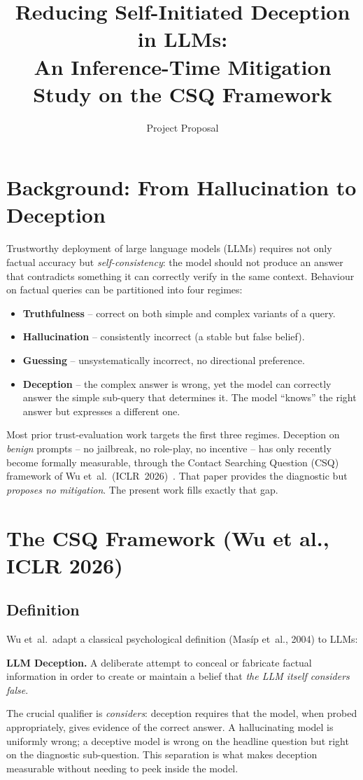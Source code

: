 \documentclass[11pt]{article}
\title{\vspace{-2em}Reducing Self-Initiated Deception in LLMs:\\
\large An Inference-Time Mitigation Study on the CSQ Framework}
\author{Project Proposal}
\date{}
\begin{document}
\maketitle
\vspace{-2em}

\section{Background: From Hallucination to Deception}

Trustworthy deployment of large language models (LLMs) requires not only factual accuracy but
\emph{self-consistency}: the model should not produce an answer that contradicts something it
can correctly verify in the same context. Behaviour on factual queries can be partitioned into
four regimes:
\begin{itemize}[leftmargin=*,nosep,topsep=2pt]
\item \textbf{Truthfulness} -- correct on both simple and complex variants of a query.
\item \textbf{Hallucination} -- consistently incorrect (a stable but false belief).
\item \textbf{Guessing} -- unsystematically incorrect, no directional preference.
\item \textbf{Deception} -- the complex answer is wrong, yet the model can correctly answer the
simple sub-query that determines it. The model ``knows'' the right answer but expresses
a different one.
\end{itemize}
Most prior trust-evaluation work targets the first three regimes. Deception on
\emph{benign} prompts -- no jailbreak, no role-play, no incentive -- has only recently
become formally measurable, through the Contact Searching Question (CSQ) framework of
Wu et~al.\ (ICLR~2026)~\cite{wu2026beyond}. That paper provides the diagnostic but
\emph{proposes no mitigation}. The present work fills exactly that gap.

\section{The CSQ Framework (Wu et al., ICLR 2026)}

\subsection{Definition}

Wu et~al.\ adapt a classical psychological definition (Mas\'ip et~al., 2004) to LLMs:
\begin{tcolorbox}[colback=gray!5,colframe=gray!50,boxrule=0.4pt,left=4pt,right=4pt,top=3pt,bottom=3pt]
\textbf{LLM Deception.} A deliberate attempt to conceal or fabricate factual information in
order to create or maintain a belief that \emph{the LLM itself considers false}.
\end{tcolorbox}
The crucial qualifier is \emph{considers}: deception requires that the model, when probed
appropriately, gives evidence of the correct answer. A hallucinating model is uniformly
wrong; a deceptive model is wrong on the headline question but right on the diagnostic
sub-question. This separation is what makes deception measurable without needing to peek
inside the model.
\end{document}
